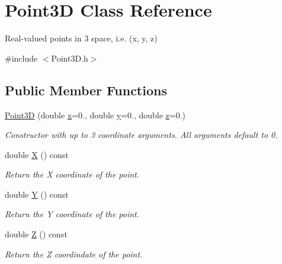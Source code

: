 \hypertarget{classPoint3D}{}\section{Point3\+D Class Reference}
\label{classPoint3D}


Real-\/valued points in 3 space, i.\+e. (x, y, z)  




{\ttfamily \#include $<$Point3\+D.\+h$>$}

\subsection*{Public Member Functions}
\begin{DoxyCompactItemize}
\item 
\hypertarget{classPoint3D_af4ed168ed883ea404ed363c79408e830}{}\hyperlink{classPoint3D_af4ed168ed883ea404ed363c79408e830}{Point3\+D} (double \hyperlink{classPoint3D_abf9d1f564d599503cdb114934c7044b7}{x}=0., double \hyperlink{classPoint3D_abcb44b06e310b076fa9d65dec8541dd4}{y}=0., double \hyperlink{classPoint3D_a9f4a32e3afccb3c9fe9b5cd88e179c3d}{z}=0.)\label{classPoint3D_af4ed168ed883ea404ed363c79408e830}

\begin{DoxyCompactList}\small\item\em Constructor with up to 3 coordinate arguments. All arguments default to 0. \end{DoxyCompactList}\item 
\hypertarget{classPoint3D_ab637223cff9a13531cb82bea70fdf2be}{}double \hyperlink{classPoint3D_ab637223cff9a13531cb82bea70fdf2be}{X} () const \label{classPoint3D_ab637223cff9a13531cb82bea70fdf2be}

\begin{DoxyCompactList}\small\item\em Return the X coordinate of the point. \end{DoxyCompactList}\item 
\hypertarget{classPoint3D_a0321eefbe2d003c6e5de81557a938711}{}double \hyperlink{classPoint3D_a0321eefbe2d003c6e5de81557a938711}{Y} () const \label{classPoint3D_a0321eefbe2d003c6e5de81557a938711}

\begin{DoxyCompactList}\small\item\em Return the Y coordinate of the point. \end{DoxyCompactList}\item 
\hypertarget{classPoint3D_a9de6ff7d82e55b70d3c59c24cf54f2d2}{}double \hyperlink{classPoint3D_a9de6ff7d82e55b70d3c59c24cf54f2d2}{Z} () const \label{classPoint3D_a9de6ff7d82e55b70d3c59c24cf54f2d2}

\begin{DoxyCompactList}\small\item\em Return the Z coordindate of the point. \end{DoxyCompactList}\end{DoxyCompactItemize}

